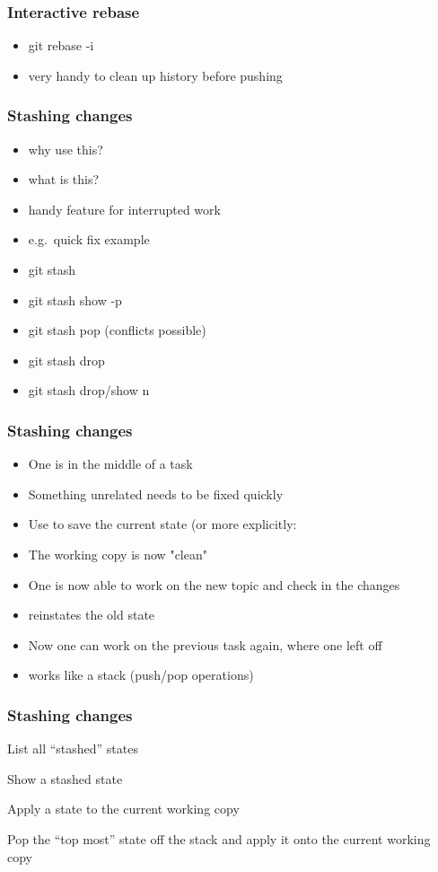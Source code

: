 \begin{frame}
\frametitle{Interactive rebase}
\begin{itemize}
    \item git rebase -i
    \item very handy to clean up history before pushing
\end{itemize}
\end{frame}

\begin{frame}
\frametitle{Stashing changes}
\begin{itemize}
    \item why use this?
    \item what is this?
    \item handy feature for interrupted work
    \item e.g.\ quick fix example
    \item git stash
    \item git stash show -p
    \item git stash pop (conflicts possible)
    \item git stash drop
    \item git stash drop/show {n}
\end{itemize}
\end{frame}

\begin{frame}
\frametitle{Stashing changes}
\begin{itemize}
    \item One is in the middle of a task
    \item Something unrelated needs to be fixed quickly
    \item Use  to save the current state (or more
        explicitly: 
    \item The working copy is now "clean"
    \item One is now able to work on the new topic and check in the
        changes
    \item {} reinstates the old state
    \item Now one can work on the previous task again, where one
        left off
    \item {} works like a stack (push/pop operations)
\end{itemize}
\end{frame}

\begin{frame}
\frametitle{Stashing changes}

\begin{description}
    \item {} List all “stashed” states
    \item {} Show a stashed state
    \item {} Apply a state to the current working copy
    \item {} Pop the “top most” state off the stack and
        apply it onto the current working copy
\end{description}
\end{frame}

